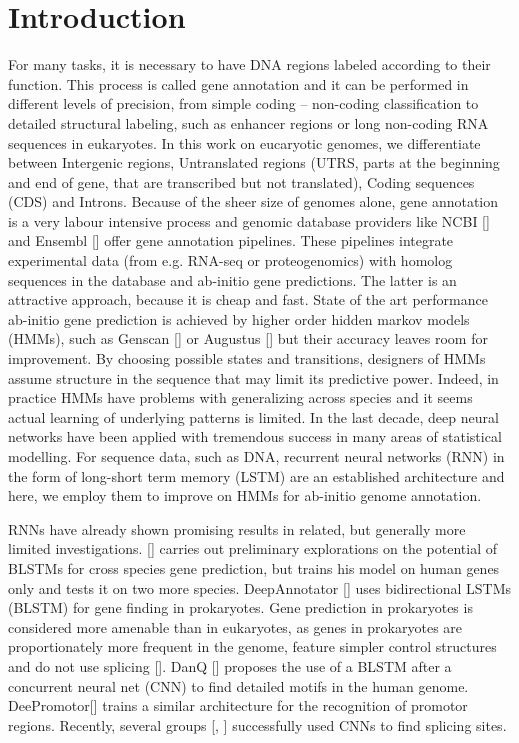 \documentclass{bioinfo}
\begin{document}
\section{Introduction}
For many tasks, it is necessary to have DNA regions labeled according to their function. This process is called gene annotation and it can be performed in different levels of precision, from simple coding -- non-coding classification to detailed structural labeling, such as enhancer regions or long non-coding RNA sequences in eukaryotes. In this work on eucaryotic genomes, we differentiate between Intergenic regions, Untranslated regions (UTRS, parts at the beginning and end of gene, that are transcribed but not translated), Coding sequences (CDS) and Introns. Because of the sheer size of genomes alone, gene annotation is a very labour intensive process and genomic database providers like NCBI [\citealp{NCBI13}] and Ensembl [\citealp{Ensembl16}] offer gene annotation pipelines. These pipelines integrate experimental data (from e.g. RNA-seq or proteogenomics) with homolog sequences in the database and ab-initio gene predictions. The latter is an attractive approach, because it is cheap and fast. State of the art performance ab-initio gene prediction is achieved by higher order hidden markov models (HMMs), such as Genscan [\citealp{Genscan}] or Augustus [\citealp{Augustus}] but their accuracy leaves room for improvement. By choosing possible states and transitions, designers of HMMs assume structure in the sequence that may limit its predictive power. Indeed, in practice HMMs have problems with generalizing across species and it seems actual learning of underlying patterns is limited. In the last decade, deep neural networks have been applied with tremendous success in many areas of statistical modelling. For sequence data, such as DNA, recurrent neural networks (RNN) in the form of long-short term memory (LSTM) are an established architecture and here, we employ them to improve on HMMs for ab-initio genome annotation.

RNNs have already shown promising results in related, but generally more limited investigations. [\citealp{Choudhary17}] carries out preliminary explorations on the potential of BLSTMs for cross species gene prediction, but trains his model on human genes only and tests it on two more species. DeepAnnotator [\citealp{DeepAnnotator}] uses bidirectional LSTMs (BLSTM) for gene finding in prokaryotes. Gene prediction in prokaryotes is considered more amenable than in eukaryotes, as genes in prokaryotes are proportionately more frequent in the genome, feature simpler control structures and do not use splicing [\citealp{Zhuo04}]. DanQ [\citealp{DanQ}] proposes the use of a BLSTM after a concurrent neural net (CNN) to find detailed motifs in the human genome. DeePromotor[\citealp{DeePromotor}] trains a similar architecture for the recognition of promotor regions. Recently, several groups [\citealp{SpliceAi}, \citealp{SpliceFinder}] successfully used CNNs to find splicing sites.
\end{document}
